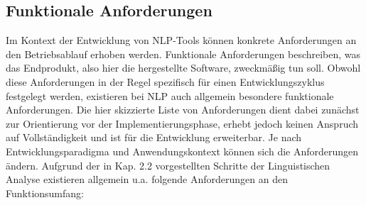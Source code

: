 \documentclass[12pt]{report}
\begin{document}
\subsection{Funktionale Anforderungen}
Im Kontext der Entwicklung von NLP-Tools können konkrete Anforderungen an den Betriebsablauf erhoben werden. Funktionale Anforderungen beschreiben, was das Endprodukt, also hier die hergestellte Software, zweckmäßig tun soll. Obwohl diese Anforderungen in der Regel spezifisch für einen Entwicklungszyklus festgelegt werden, existieren bei NLP auch allgemein besondere funktionale Anforderungen. Die hier skizzierte Liste von Anforderungen dient dabei zunächst zur Orientierung vor der Implementierungsphase, erhebt jedoch keinen Anspruch auf Vollständigkeit und ist für die Entwicklung erweiterbar. Je nach Entwicklungsparadigma und Anwendungskontext können sich die Anforderungen ändern. Aufgrund der in Kap. 2.2 vorgestellten Schritte der Linguistischen Analyse existieren allgemein u.a. folgende Anforderungen an den Funktionsumfang:
\end{document}
